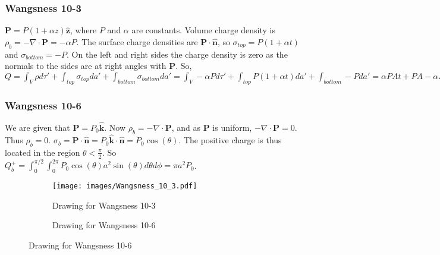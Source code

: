             \subsubsection{Wangsness 10-3}
            $\mathbf{P}= P(1+\alpha z)\hat{\mathbf{z}}$, where $P$ and $\alpha$ are constants. Volume charge density is $\rho_{b} = -\nabla \cdot \mathbf{P} = -\alpha P$. The surface charge densities are $\mathbf{P}\cdot \hat{\mathbf{n}}$, so $\sigma_{top} = P(1+\alpha t)$ and $\sigma_{bottom} = -P$. On the left and right sides the charge density is zero as the normals to the sides are at right angles with $\mathbf{P}$. So, $Q = \int_{V} \rho d\tau' + \int_{top} \sigma_{top} da' + \int_{bottom} \sigma_{bottom} da' = \int_{V}-\alpha P d\tau' + \int_{top}P(1+\alpha t) da' + \int_{bottom} - Pda' = \alpha PAt + PA - \alpha PA t - PA = 0$
            \subsubsection{Wangsness 10-6}
            We are given that $\mathbf{P} = P_0 \hat{\mathbf{k}}$. Now $\rho_{b} = -\nabla \cdot \mathbf{P}$, and as $\mathbf{P}$ is uniform, $-\nabla \cdot \mathbf{P} = 0$. Thus $\rho_b = 0$. $\sigma_b = \mathbf{P}\cdot \hat{\mathbf{n}} = P_0 \hat{\mathbf{k}} \cdot \hat{\mathbf{n}} = P_0 \cos(\theta)$. The positive charge is thus located in the region $\theta < \frac{\pi}{2}$. So $Q_b^+ = \int_{0}^{\pi/2}\int_{0}^{2\pi} P_0 \cos(\theta) a^2 \sin(\theta) d\theta d\phi = \pi a^2 P_0$.
            \begin{figure}[htbp]
                \centering
                \begin{subfigure}[b]{0.49\textwidth}
                    \centering
                    \captionsetup{type=figure}
                    \texttt{[image: images/Wangsness\_10\_3.pdf]}
                    \caption{Drawing for Wangsness 10-3}
                \end{subfigure}
                \begin{subfigure}[b]{0.49\textwidth}
                    \centering
                    \captionsetup{type=figure}
                    
                    \caption{Drawing for Wangsness 10-6}
                \end{subfigure}
            \end{figure}

